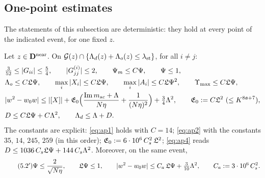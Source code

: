 \subsection{One-point estimates}
The statements of this subsection are deterministic: they hold at every point of the indicated event, for one fixed $z$.
\begin{lemma}\label{lem:apriori}
Let $z\in\mathbf{D}^{\rm near}$. On $\mathcal{G}(z)\cap\{\Lambda_d(z)+\Lambda_o(z)\le\lambda_{\rm st}\}$, for all $i\ne j$:
\begin{align}
 &\tfrac3{52}\le|G_{ii}|\le\tfrac54,\qquad|G^{(i)}_{jj}|\le2,\qquad\Psi_m\le C\Psi,\qquad\Psi\le1,\label{eq:ap1}\\
 &\Lambda_o\le C\mathfrak{L}\Psi,\qquad\max_i|X_i|\le C\mathfrak{L}\Psi,\qquad\max_i|A_i|\le C\mathfrak{L}\Psi^2,\qquad\Upsilon_{\max}\le C\mathfrak{L}\Psi,\label{eq:ap2}\\
 &|w^2-w_0w|\le|[X]|+\mathfrak E_0\Big(\frac{\operatorname{Im}m_{sc}+\Lambda}{N\eta}+\frac1{(N\eta)^2}\Big)+\tfrac34\Lambda^2,\qquad\mathfrak E_0:=C\mathfrak{L}^2\ (\le K^{8\mathfrak{a}+7}),\label{eq:ap3}\\
 &D\le C\mathfrak{L}\Psi+C\Lambda^2,\qquad\Lambda_d\le\Lambda+D.\label{eq:ap4}
\end{align}
The constants are explicit: \eqref{eq:ap1} holds with $C=14$; \eqref{eq:ap2} with the constants $35$, $14$, $245$, $259$ (in this order); $\mathfrak E_0:=6\cdot10^6\,C_s^2\,\mathfrak{L}^2$; \eqref{eq:ap4} reads $D\le1036\,C_s\mathfrak{L}\Psi+144\,C_s\Lambda^2$.
Moreover, on the same event,
\begin{equation}\tag{5.2$'$}\label{eq:ap1b}
 \Psi\le\frac2{\sqrt{N\eta}},\qquad\mathfrak{L}\Psi\le1,\qquad|w^2-w_0w|\le C_a\,\mathfrak{L}\Psi+\tfrac3{10}\Lambda^2,\qquad C_a:=3\cdot10^6\,C_s^2 .
\end{equation}
\end{lemma}

